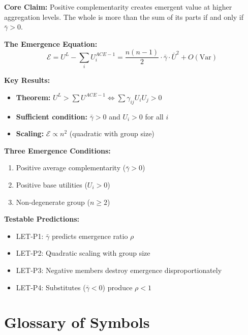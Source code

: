 \begin{tcolorbox}[colback=green!10!white, colframe=green!75!black,
    title=\textbf{Appendix LET Summary: The Level Emergence Theorem}]

\textbf{Core Claim:}
Positive complementarity creates emergent value at higher aggregation levels.
The whole is more than the sum of its parts if and only if $\bar{\gamma} > 0$.

\textbf{The Emergence Equation:}
\begin{equation*}
\mathcal{E} = U^L - \sum_i U^{ACE-1}_i = \frac{n(n-1)}{2} \cdot \bar{\gamma} \cdot \bar{U}^2 + O(\text{Var})
\end{equation*}

\textbf{Key Results:}
\begin{itemize}[nosep]
\item \textbf{Theorem:} $U^L > \sum U^{ACE-1} \Leftrightarrow \sum \gamma_{ij} U_i U_j > 0$
\item \textbf{Sufficient condition:} $\bar{\gamma} > 0$ and $U_i > 0$ for all $i$
\item \textbf{Scaling:} $\mathcal{E} \propto n^2$ (quadratic with group size)
\end{itemize}

\textbf{Three Emergence Conditions:}
\begin{enumerate}[nosep]
\item Positive average complementarity ($\bar{\gamma} > 0$)
\item Positive base utilities ($U_i > 0$)
\item Non-degenerate group ($n \geq 2$)
\end{enumerate}

\textbf{Testable Predictions:}
\begin{itemize}[nosep]
\item LET-P1: $\bar{\gamma}$ predicts emergence ratio $\rho$
\item LET-P2: Quadratic scaling with group size
\item LET-P3: Negative members destroy emergence disproportionately
\item LET-P4: Substitutes ($\bar{\gamma} < 0$) produce $\rho < 1$
\end{itemize}

\end{tcolorbox}


\section{Glossary of Symbols}

